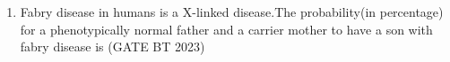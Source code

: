 \begin{enumerate}[label=\thechapter.\arabic*,ref=\thechapter.\theenumi]
\item Fabry disease in humans is a X-linked disease.The probability(in percentage) for a phenotypically normal father and a carrier mother to have a son with fabry disease is
\hfill (GATE BT 2023) \\

\end{enumerate}
